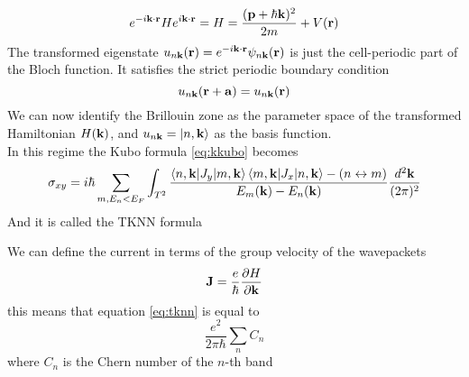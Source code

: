\begin{equation}
    e^{-i\mathbf{k}\cdot \mathbf{r}}He^{i\mathbf{k}\cdot \mathbf{r}}= H= \frac {(\mathbf{p}+\hbar \mathbf{k})^2}{2m} + V(\mathbf{r})
\end{equation}
The transformed eigenstate $u_{n\mathbf{k}}(\mathbf{r})= e^{-i\mathbf{k}\cdot \mathbf{r}}\psi_{n\mathbf{k}}(\mathbf{r})$ is just the cell-periodic part of the Bloch function. It satisfies the strict periodic boundary condition 
\begin{equation}
    u_{n\mathbf{k}}(\mathbf{r}+\mathbf{a})=u_{n\mathbf{k}}(\mathbf{r})
\end{equation}
We can now identify the Brillouin zone as the parameter space of the transformed Hamiltonian $H(\mathbf{k})$, and $u_{n\mathbf{k}}=\ket{n,\mathbf{k}}$ as the basis function.\\
In this regime the Kubo formula \ref{eq:kkubo} becomes 
\begin{equation}
    \sigma_{xy}=i\hbar\sum_{m,E_n<E_F}\int_{T^2}
    \frac{
        \braket{n,\mathbf{k}|J_y}{m,\mathbf{k}}\braket{m,\mathbf{k}|J_x}{n,\mathbf{k}} - (n\leftrightarrow m)
    }
    {
        E_m(\mathbf{k})-E_n(\mathbf{k})
    }
    \frac{d^2\mathbf{k}}{(2\pi)^2}
    \label{eq:tknn}
\end{equation}
And it is called the TKNN formula \cite{thouless1982quantized}

We can define the current in terms of the group velocity of the wavepackets
\begin{equation}
    \mathbf{J}=\frac e\hbar \frac{\partial H}{\partial \mathbf{k}}
\end{equation}
this means that equation \ref{eq:tknn} is equal to
\begin{equation}
    \frac{e^2}{2\pi\hbar}\sum_{n}C_n
\end{equation}
where $C_n$ is the Chern number of the $n$-th band















